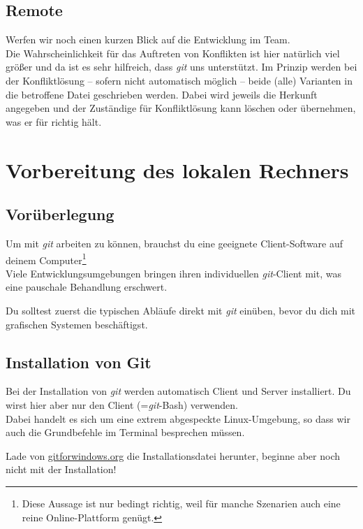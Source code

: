 \documentclass[
  letterpaper,
  DIV=11]{scrreprt}
\newcommand{\git}{\textit{git}\xspace}
\begin{document}
\section{Remote}\label{remote}

Werfen wir noch einen kurzen Blick auf die Entwicklung im Team.\\
Die Wahrscheinlichkeit für das Auftreten von Konflikten ist hier
natürlich viel größer und da ist es sehr hilfreich, dass \git uns
unterstützt. Im Prinzip werden bei der Konfliktlösung -- sofern nicht
automatisch möglich -- beide (alle) Varianten in die betroffene Datei
geschrieben werden. Dabei wird jeweils die Herkunft angegeben und der
Zuständige für Konfliktlösung kann löschen oder übernehmen, was er für
richtig hält.


\chapter{Vorbereitung des lokalen
Rechners}\label{vorbereitung-des-lokalen-rechners}

\section{Vorüberlegung}\label{voruxfcberlegung}

Um mit \git arbeiten zu können, brauchst du eine geeignete
Client-Software auf deinem Computer\footnote{Diese Aussage ist nur
  bedingt richtig, weil für manche Szenarien auch eine reine
  Online-Plattform genügt.}\\
Viele Entwicklungsumgebungen bringen ihren individuellen \git-Client
mit, was eine pauschale Behandlung erschwert.

Du solltest zuerst die typischen Abläufe direkt mit \git einüben, bevor
du dich mit grafischen Systemen beschäftigst.

\section{Installation von Git}\label{installation-von-git}

Bei der Installation von \git werden automatisch Client und Server
installiert. Du wirst hier aber nur den Client (=\git-Bash) verwenden.\\
Dabei handelt es sich um eine extrem abgespeckte Linux-Umgebung, so dass
wir auch die Grundbefehle im Terminal besprechen müssen.

Lade von \href{https://gitforwindows.org}{gitforwindows.org} die
Installationsdatei herunter, beginne aber noch nicht mit der
Installation!
\end{document}
